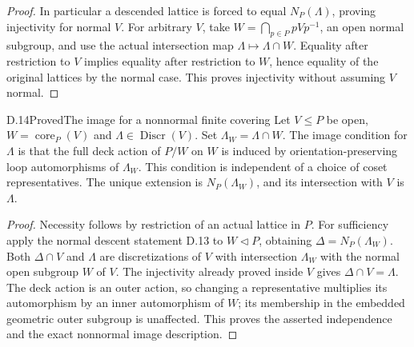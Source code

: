 \begin{proof}
In particular a descended lattice is forced to equal $N_P(\Lambda)$, proving injectivity for normal $V$. For arbitrary $V$, take $W=\bigcap_{p\in P}pVp^{-1}$, an open normal subgroup, and use the actual intersection map $\Lambda\mapsto\Lambda\cap W$. Equality after restriction to $V$ implies equality after restriction to $W$, hence equality of the original lattices by the normal case. This proves injectivity without assuming $V$ normal.
\end{proof}

\begin{claim}{D.14}{Proved}{The image for a nonnormal finite covering}
Let $V\leq P$ be open, $W=\operatorname{core}_P(V)$ and $\Lambda\in\operatorname{Discr}(V)$. Set $\Lambda_W=\Lambda\cap W$. The image condition for $\Lambda$ is that the full deck action of $P/W$ on $W$ is induced by orientation-preserving loop automorphisms of $\Lambda_W$. This condition is independent of a choice of coset representatives. The unique extension is $N_P(\Lambda_W)$, and its intersection with $V$ is $\Lambda$.
\end{claim}
\begin{proof}
Necessity follows by restriction of an actual lattice in $P$. For sufficiency apply the normal descent statement D.13 to $W\triangleleft P$, obtaining $\Delta=N_P(\Lambda_W)$. Both $\Delta\cap V$ and $\Lambda$ are discretizations of $V$ with intersection $\Lambda_W$ with the normal open subgroup $W$ of $V$. The injectivity already proved inside $V$ gives $\Delta\cap V=\Lambda$. The deck action is an outer action, so changing a representative multiplies its automorphism by an inner automorphism of $W$; its membership in the embedded geometric outer subgroup is unaffected. This proves the asserted independence and the exact nonnormal image description.
\end{proof}

